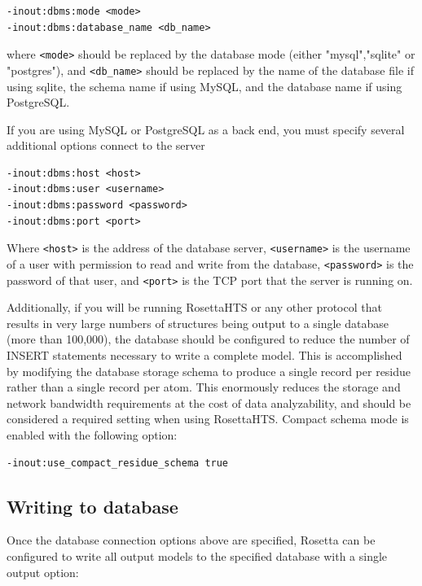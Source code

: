 \singlespace
\begin{Verbatim}
-inout:dbms:mode <mode>
-inout:dbms:database_name <db_name>
\end{Verbatim}
\doublespace

where \texttt{<mode>} should be replaced by the database mode (either "mysql","sqlite" or "postgres"), and \texttt{<db\_name>} should be replaced by the name of the database file if using sqlite, the schema name if using MySQL, and the database name if using PostgreSQL.

If you are using MySQL or PostgreSQL as a back end, you must specify several additional options connect to the server

\singlespace
\begin{Verbatim}
-inout:dbms:host <host>
-inout:dbms:user <username>
-inout:dbms:password <password>
-inout:dbms:port <port>
\end{Verbatim}
\doublespace

Where \texttt{<host>} is the address of the database server, \texttt{<username>} is the username of a user with permission to read and write from the database, \texttt{<password>} is the password of that user, and \texttt{<port>} is the TCP port that the server is running on. 

Additionally, if you will be running RosettaHTS or any other protocol that results in very large numbers of structures being output to a single database (more than 100,000), the database should be configured to reduce the number of INSERT statements necessary to write a complete model.
This is accomplished by modifying the database storage schema to produce a single record per residue rather than a single record per atom.  This enormously reduces the storage and network bandwidth requirements at the cost of data analyzability, and should be considered a required setting when using RosettaHTS.
Compact schema mode is enabled with the following option:

\singlespace
\begin{Verbatim}
-inout:use_compact_residue_schema true
\end{Verbatim}
\doublespace

\subsection{Writing to database}

Once the database connection options above are specified, Rosetta can be configured to write all output models to the specified database with a single output option:

